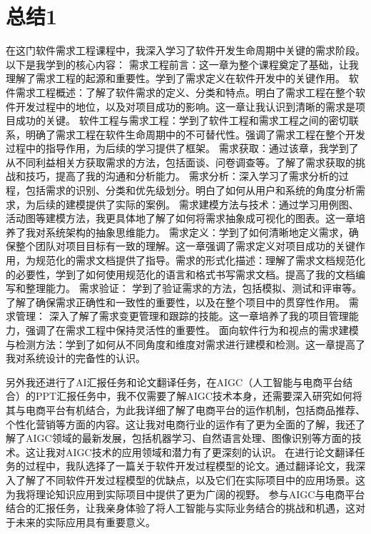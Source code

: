 \documentclass[11pt, a4paper, oneside]{ctexbook}
\begin{document}
\section{总结1}
在这门软件需求工程课程中，我深入学习了软件开发生命周期中关键的需求阶段。以下是我学到的核心内容：
需求工程前言：这一章为整个课程奠定了基础，让我理解了需求工程的起源和重要性。学到了需求定义在软件开发中的关键作用。
软件需求工程概述：了解了软件需求的定义、分类和特点。明白了需求工程在整个软件开发过程中的地位，以及对项目成功的影响。这一章让我认识到清晰的需求是项目成功的关键。
软件工程与需求工程：学到了软件工程和需求工程之间的密切联系，明确了需求工程在软件生命周期中的不可替代性。强调了需求工程在整个开发过程中的指导作用，为后续的学习提供了框架。
需求获取：通过该章，我学到了从不同利益相关方获取需求的方法，包括面谈、问卷调查等。了解了需求获取的挑战和技巧，提高了我的沟通和分析能力。
需求分析：深入学习了需求分析的过程，包括需求的识别、分类和优先级划分。明白了如何从用户和系统的角度分析需求，为后续的建模提供了实际的案例。
需求建模方法与技术：通过学习用例图、活动图等建模方法，我更具体地了解了如何将需求抽象成可视化的图表。这一章培养了我对系统架构的抽象思维能力。
需求定义：学到了如何清晰地定义需求，确保整个团队对项目目标有一致的理解。这一章强调了需求定义对项目成功的关键作用，为规范化的需求文档提供了指导。需求的形式化描述：理解了需求文档规范化的必要性，学到了如何使用规范化的语言和格式书写需求文档。提高了我的文档编写和整理能力。
需求验证： 学到了验证需求的方法，包括模拟、测试和评审等。了解了确保需求正确性和一致性的重要性，以及在整个项目中的贯穿性作用。
需求管理： 深入了解了需求变更管理和跟踪的技能。这一章培养了我的项目管理能力，强调了在需求工程中保持灵活性的重要性。
面向软件行为和视点的需求建模与检测方法：学到了如何从不同角度和维度对需求进行建模和检测。这一章提高了我对系统设计的完备性的认识。


另外我还进行了AI汇报任务和论文翻译任务，在AIGC（人工智能与电商平台结合）的PPT汇报任务中，我不仅需要了解AIGC技术本身，还需要深入研究如何将其与电商平台有机结合，为此我详细了解了电商平台的运作机制，包括商品推荐、个性化营销等方面的内容。这让我对电商行业的运作有了更为全面的了解，我还了解了AIGC领域的最新发展，包括机器学习、自然语言处理、图像识别等方面的技术。这让我对AIGC技术的应用领域和潜力有了更深刻的认识。
在进行论文翻译任务的过程中，我队选择了一篇关于软件开发过程模型的论文。通过翻译论文，我深入了解了不同软件开发过程模型的优缺点，以及它们在实际项目中的应用场景。这为我将理论知识应用到实际项目中提供了更为广阔的视野。
参与AIGC与电商平台结合的汇报任务，让我亲身体验了将人工智能与实际业务结合的挑战和机遇，这对于未来的实际应用具有重要意义。
\end{document}
